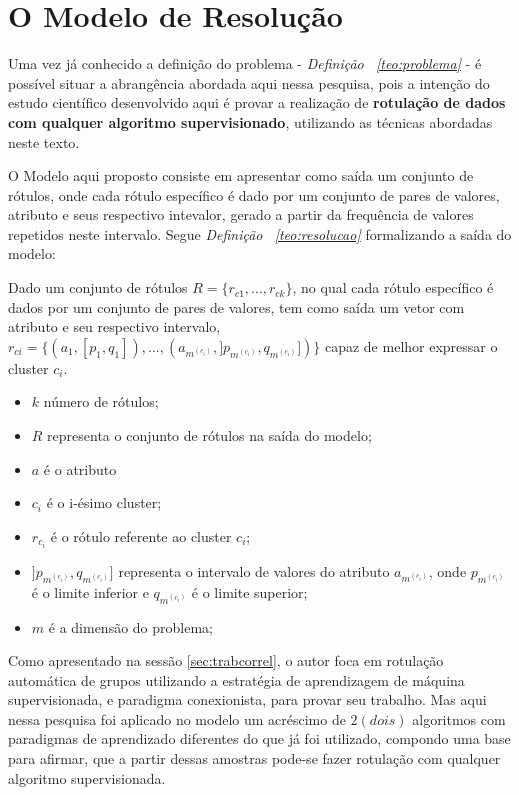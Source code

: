 \section{O Modelo de Resolução}\label{cap:ferramentas:sec:modeloresolucao}

Uma vez já conhecido a definição do problema - \textit{Definição ~\ref{teo:problema}} - é possível situar a abrangência abordada aqui nessa pesquisa, pois a intenção do estudo científico desenvolvido aqui é provar a realização de \textbf{rotulação de dados com qualquer algoritmo supervisionado}, utilizando as técnicas abordadas neste texto.

O Modelo aqui proposto consiste em apresentar como saída um conjunto de rótulos, onde cada rótulo específico é dado por um conjunto de pares de valores, atributo e seus respectivo intevalor, gerado a partir da frequência de valores repetidos neste intervalo. Segue \textit{Definição ~\ref{teo:resolucao}} formalizando a saída do modelo:
    \begin{defprob}
    Dado um conjunto de rótulos ${ R=\{ r_{c1},...,r_{ck} \} }$, no qual cada rótulo específico é dados por um conjunto de pares de valores, tem como saída um vetor com atributo e seu respectivo intervalo, ${ r_{ci}=\{ (a_1,[p_1,q_1]),...,(a_{m^{(c_i)}}, ]p_{m^{(c_i)}},q_{m^{(c_i)}}]) \} }$ capaz de melhor expressar o cluster ${c_i}$.
        \footnotemark 
        \begin{itemize}[noitemsep]
            \item ${k}$ número de rótulos;
            \item ${R}$ representa o conjunto de rótulos na saída do modelo;
            \item ${a}$ é o atributo
            \item ${c_i}$ é o i-ésimo cluster;
            \item ${r_{c_i}}$ é o rótulo referente ao cluster ${c_i}$;
            \item ${]p_{m^{(c_i)}},q_{m^{(c_i)}}]}$ representa o intervalo de valores do atributo ${a_{m^{(c_i)}} }$, onde ${ p_{m^{(c_i)}} }$  é o limite inferior e ${ q_{m^{(c_i)}} }$ é o limite superior;
            \item ${m}$ é a dimensão do problema;
        \end{itemize}
    \label{teo:resolucao}
    \end{defprob}

Como apresentado na sessão \ref{sec:trabcorrel}, o autor foca em rotulação automática de grupos utilizando a estratégia de aprendizagem de máquina supervisionada, e paradigma conexionista, para provar seu trabalho. Mas aqui nessa pesquisa foi aplicado no modelo um acréscimo de ${2 (dois)}$ algoritmos com paradigmas de aprendizado diferentes do que já foi utilizado, compondo uma base para afirmar, que a partir dessas amostras pode-se fazer rotulação com qualquer algoritmo supervisionada.


